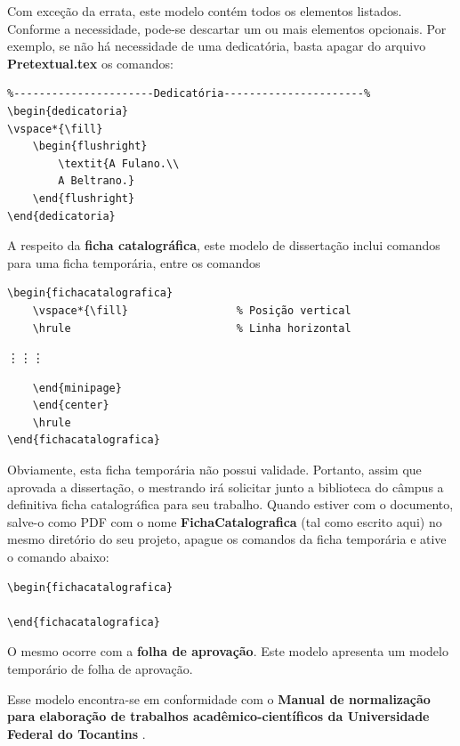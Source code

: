 Com exceção da errata, este modelo contém todos os elementos listados. Conforme a necessidade, pode-se descartar um ou mais elementos opcionais. Por exemplo, se não há necessidade de uma dedicatória, basta apagar do arquivo \textbf{Pretextual.tex} os comandos:
\begin{verbatim}
%----------------------Dedicatória----------------------%
\begin{dedicatoria}
\vspace*{\fill}
	\begin{flushright}
		\textit{A Fulano.\\
   		A Beltrano.}
	\end{flushright}
\end{dedicatoria}
\end{verbatim}

A respeito da \textbf{ficha catalográfica}, este modelo de dissertação inclui comandos para uma ficha temporária, entre os comandos
\begin{verbatim}
\begin{fichacatalografica}
	\vspace*{\fill}					% Posição vertical
	\hrule							% Linha horizontal
\end{verbatim}
\qquad \qquad \vdots \quad \vdots \quad \vdots
\begin{verbatim}
	\end{minipage}
	\end{center}
	\hrule
\end{fichacatalografica}
\end{verbatim}

Obviamente, esta ficha temporária não possui validade. Portanto, assim que aprovada a dissertação, o mestrando irá solicitar junto a biblioteca do câmpus a definitiva ficha catalográfica para seu trabalho. Quando estiver com o documento, salve-o como PDF com o nome \textbf{FichaCatalografica} (tal como escrito aqui) no mesmo diretório do seu projeto, apague os comandos da ficha temporária e ative o comando abaixo:
\begin{verbatim}
\begin{fichacatalografica}
	
\end{fichacatalografica}
\end{verbatim}

O mesmo ocorre com a \textbf{folha de aprovação}. Este modelo apresenta um modelo temporário de folha de aprovação.

Esse modelo encontra-se em conformidade com o \textbf{Manual de normalização para elaboração de trabalhos acadêmico-científicos da Universidade Federal do Tocantins} \cite{ManualUFT}. 

